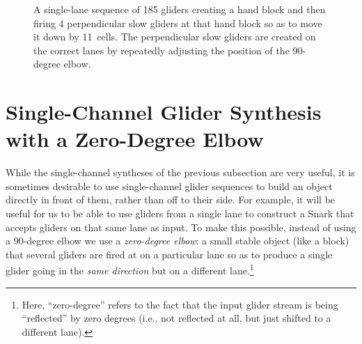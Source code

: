 \begin{figure}[!htb]
	
	\caption{A single-lane sequence of 185 gliders creating a hand block and then firing 4 perpendicular slow gliders at that hand block so as to move it down by 11~cells. The perpendicular slow gliders are created on the correct lanes by repeatedly adjusting the position of the 90-degree elbow.}\label{fig:90_degree_block_move}
\end{figure}



\section{Single-Channel Glider Synthesis with a Zero-Degree Elbow}\label{sec:single_channel_synth_0}

While the single-channel syntheses of the previous subsection are very useful, it is sometimes desirable to use single-channel glider sequences to build an object directly in front of them, rather than off to their side. For example, it will be useful for us to be able to use gliders from a single lane to construct a Snark that accepts gliders on that same lane as input. To make this possible, instead of using a 90-degree elbow we use a \emph{zero-degree elbow}: a small stable object (like a block) that several gliders are fired at on a particular lane so as to produce a single glider going in the \emph{same direction} but on a different lane.\footnote{Here, ``zero-degree'' refers to the fact that the input glider stream is being ``reflected'' by zero degrees (i.e., not reflected at all, but just shifted to a different lane).}


